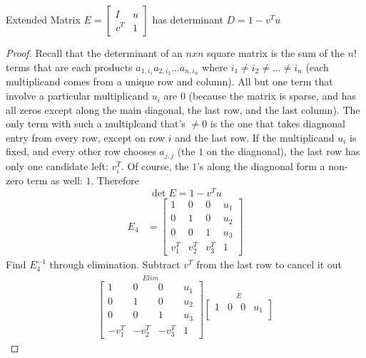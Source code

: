\documentclass{article}
\begin{document}
\begin{axiom}
  Extended Matrix $E=
    \begin{bmatrix}
      I   & u \\
      v^T & 1
    \end{bmatrix}$
  has determinant $D=1-v^Tu$
\end{axiom}
\begin{proof}
  Recall that the determinant of an $nxn$ square matrix is the sum of the $n!$
  terms that are each products $a_{1,i_1}a_{2,i_2}...a_{n,i_n}$ where
  $i_{1}\neq i_{2}\neq ... \neq i_{n}$ (each multiplicand comes from a unique row and column).  All but one term that involve a
  particular multiplicand $u_i$ are $0$ (because the matrix is sparse, and has
  all zeros except along the main diagonal, the last row, and the last column).
  The only term with such a multiplcand that's $\neq 0$ is the one that takes diagnonal
  entry from every row, except on row $i$ and the last row.  If the multiplicand $u_i$
  is fixed, and every other row chooses $a_{j,j}$ (the $1$ on the diagnonal), the last row
  has only one candidate left: $v^T_i$.  Of course, the $1$'s along the diagnonal form
  a non-zero term as well: $1$.  Therefore
  \begin{equation}
    \det{E}=1-v^Tu
  \end{equation}
  \begin{align*}
    E_4 & =
    \begin{bmatrix}
      1     & 0     & 0     & u_1 \\
      0     & 1     & 0     & u_2 \\
      0     & 0     & 1     & u_3 \\
      v^T_1 & v^T_2 & v^T_3 & 1
    \end{bmatrix}
  \end{align*}
  Find $E_4^{-1}$ through elimination. Subtract $v^T$ from the last row to
  cancel it out
  \begin{align*}
    \stackrel{Elim}{
      \begin{bmatrix}
        1      & 0      & 0      & u_1 \\
        0      & 1      & 0      & u_2 \\
        0      & 0      & 1      & u_3 \\
        -v_1^T & -v_2^T & -v_3^T & 1
      \end{bmatrix}
    }
    \stackrel{E}{
      \begin{bmatrix}
        1     & 0     & 0     & u_1 \\

\end{bmatrix}}
\end{align*}
\end{proof}
\end{document}

